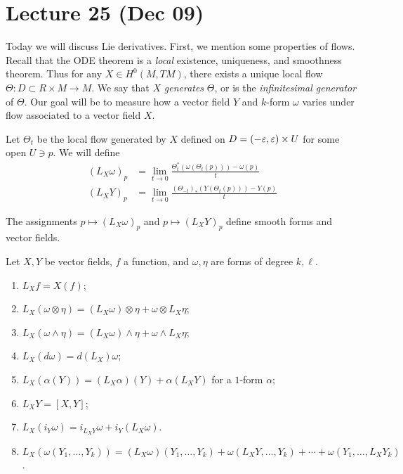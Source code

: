 \documentclass[twoside, 10pt]{article}
\begin{document}
    \section{Lecture 25 (Dec 09)}%
    
    Today we will discuss Lie derivatives. First, we mention some properties of
    flows. Recall that the ODE theorem is a \textit{local} existence,
    uniqueness, and smoothness theorem. Thus for any $X \in H^0(M, TM)$, there
    exists a unique local flow $\Theta: D \subset R \times M \to M$. We say
    that $X$ \textit{generates} $\Theta$, or is the \textit{infinitesimal
    generator} of $\Theta$. Our goal will be to measure how a vector field $Y$
    and $k$-form $\omega$ varies under flow associated to a vector field $X$.

    Let $\Theta_t$ be the local flow generated by $X$ defined on $D = (-\varepsilon,
    \varepsilon) \times U$ for some open $U \ni p$. We will define \begin{align*} (L_X
        \omega)_p &= \lim_{t \to 0} \frac{\Theta_t^*(\omega(\Theta_t(p))) -
        \omega(p)}{t} \\ (L_X Y)_p &= \lim_{t \to 0}
        \frac{(\Theta_{-t})_*(Y(\Theta_t(p))) - Y(p)}{t} \end{align*}
    
    \begin{lem} The assignments $p \mapsto (L_X \omega)_p$ and $p \mapsto (L_X
    Y)_p$ define smooth forms and vector fields.  \end{lem}

    \begin{prop} Let $X, Y$ be vector fields, $f$ a function, and $\omega,
        \eta$ are forms of degree $k, \ell$.  \begin{enumerate} \item $L_X f =
            X(f)$; \item $L_X(\omega \otimes \eta) = (L_X \omega) \otimes \eta
            + \omega \otimes L_X \eta$; \item $L_X (\omega \wedge \eta) = (L_X
            \omega) \wedge \eta + \omega \wedge L_X \eta$; \item $L_X(d\omega)
            = d(L_X)\omega$; \item $L_X(\alpha(Y)) = (L_X \alpha)(Y) +
            \alpha(L_X Y)$ for a $1$-form $\alpha$; \item $L_X Y = [X,Y]$;
        \item $L_X(i_Y \omega) = i_{L_X Y} \omega + i_Y(L_X \omega)$.  \item
            $L_X(\omega(Y_1, \ldots, Y_k)) = (L_X \omega)(Y_1, \ldots, Y_k) +
            \omega(L_X Y, \ldots, Y_k) + \cdots + \omega(Y_1, \ldots, L_X
            Y_k)$.  \end{enumerate} \end{prop}
\end{document}
